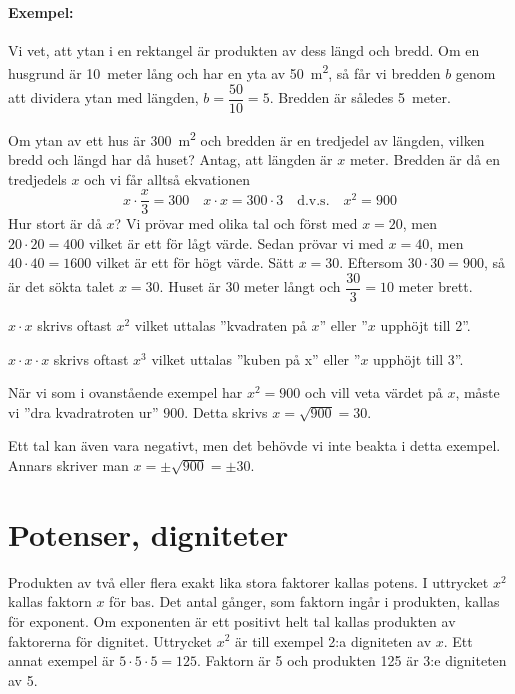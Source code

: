 \paragraph{Exempel:}
Vi vet, att ytan i en rektangel är produkten av dess längd och bredd.
Om en husgrund är 10~meter lång och har en yta av \qty{50}{\square\metre}, så får
vi bredden \(b\) genom att dividera ytan med längden, \(b = \dfrac{50}{10} = 5\).
Bredden är således 5~meter.

Om ytan av ett hus är \qty{300}{\square\metre} och bredden är en tredjedel av
längden, vilken bredd och längd har då huset?
Antag, att längden är \(x\) meter.
Bredden är då en tredjedels \(x\) och vi får alltså ekvationen
%
\[
x \cdot \frac{x}{3} = 300 \quad
x \cdot x = 300 \cdot 3 \quad \text{d.v.s.}
\quad x^2 = 900
\]
%
Hur stort är då \(x\)?
Vi prövar med olika tal och först med \(x = 20\), men \(20 \cdot 20 = 400\)
vilket är ett för lågt värde.
Sedan prövar vi med \(x = 40\), men \(40 \cdot 40 = 1600\) vilket är ett för
högt värde.
Sätt \(x = 30\). Eftersom \(30 \cdot 30 = 900\), så är det sökta talet
\(x = 30\).
Huset är 30 meter långt och \(\dfrac{30}{3} = 10\) meter brett.

\(x \cdot x\) skrivs oftast \(x^2\) vilket uttalas ''kvadraten på \(x\)''
eller ''\(x\) upphöjt till 2''.

\(x \cdot x \cdot x\) skrivs oftast \(x^3\) vilket uttalas ''kuben på x''
eller ''\(x\) upphöjt till 3''.

När vi som i ovanstående exempel har \(x^2 = 900\) och vill veta värdet på
\(x\), måste vi ''dra kvadratroten ur'' \(900\).
Detta skrivs \(x = \sqrt{900} = 30\).

Ett tal kan även vara negativt, men det behövde vi inte beakta i detta exempel.
Annars skriver man \(x = \pm \sqrt{900} = \pm 30\).

\section{Potenser, digniteter}
\label{potenser}

Produkten av två eller flera exakt lika stora faktorer kallas potens.
I uttrycket \(x^2\) kallas faktorn \(x\) för bas. Det antal gånger, som faktorn
ingår i produkten, kallas för exponent.
Om exponenten är ett positivt helt tal kallas produkten av faktorerna för
dignitet.
Uttrycket \(x^2\) är till exempel 2:a digniteten av \(x\).
Ett annat exempel är \(5 \cdot 5 \cdot 5 = 125\).
Faktorn är 5 och produkten 125 är 3:e digniteten av 5.

